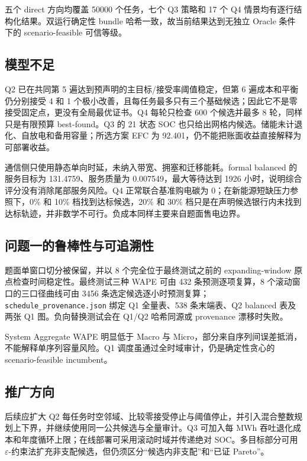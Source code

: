 \documentclass[withoutpreface,bwprint]{cumcmthesis}
\begin{document}
五个 direct 方向均覆盖 50000 个任务，七个 Q3 策略和 17 个 Q4 情景均有逐行结构化结果。双运行确定性 bundle 哈希一致，故当前结果达到无独立 Oracle 条件下的 scenario-feasible 可信等级。

\subsection{模型不足}
Q2 已在共同第 5 遍达到预声明的主目标/接受率阈值稳定，但第 6 遍成本和平衡仍分别接受 4 和 1 个极小改善，且每任务最多只有三个基础候选；因此它不是零接受固定点，更没有全局最优证书。Q4 每轮只检查 600 个候选并最多 8 轮，同样只是有限预算 best-found。Q3 的 21 状态 SOC 也只给出网格内候选。储能未计退化、自放电和备用容量；所选方案 EFC 为 92.401，仍不能把账面收益直接解释为可部署收益。

通信侧只使用静态单向时延，未纳入带宽、拥塞和迁移能耗。formal balanced 的服务目标为 131.4759、服务质量为 0.007549，最大等待达到 1926 小时，说明综合评分没有消除尾部服务风险。Q4 正常联合基准购电碳为 0；在新能源短缺压力参照下，0\% 和 10\% 档找到达标候选，20\% 和 30\% 档只是在声明候选银行内未找到达标轨迹，并非数学不可行。负成本同样主要来自题面售电边界。

\subsection{问题一的鲁棒性与可追溯性}
题面单窗口切分被保留，并以 8 个完全位于最终测试之前的 expanding-window 原点检查时间稳定性。最终测试三种 WAPE 可由 432 条预测逐项复算，8 个滚动窗口的三口径曲线可由 3456 条选定候选逐小时预测复算；\texttt{schedule\_provenance.json} 绑定 Q1 全量表、538 条末端表、Q2 balanced 表及两张 Q1 图。负向替换测试会在 Q1/Q2 哈希同源或 provenance 漂移时失败。

System Aggregate WAPE 明显低于 Macro 与 Micro，部分来自序列间误差抵消，不能解释单序列容量风险。Q1 调度虽通过全时域审计，仍是确定性贪心的 scenario-feasible incumbent。

\subsection{推广方向}
后续应扩大 Q2 每任务时空邻域、比较零接受停止与阈值停止，并引入混合整数规划上下界，并继续使用同一公共候选与全量审计。Q3 可加入每 MWh 吞吐退化成本和年度循环上限；在线部署可采用滚动时域并传递绝对 SOC。多目标部分可用 $\varepsilon$-约束法扩充非支配候选\cite{miettinen1999nonlinear}，但仍须区分“候选内非支配”和“已证 Pareto”。


\end{document}
